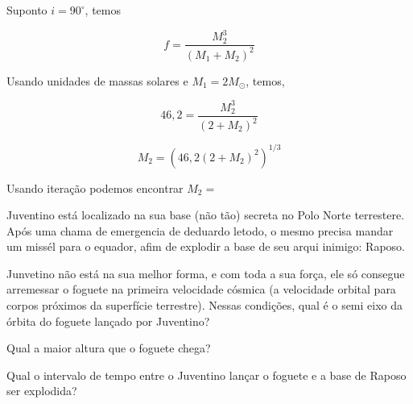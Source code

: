 \documentclass[11pt]{article}
\begin{document}
\begin{pproblem}
\begin{pssolution*}{}{}
\begin{alternativas}
            \item Suponto $i = 90^\circ$, temos 
            
            $$f = \frac{M_2^3}{(M_1+M_2)^2}$$

            Usando unidades de massas solares e $M_1 = 2M_\odot$, temos, 

            $$46,2 = \frac{M_2^3}{(2+M_2)^2}$$

            $$M_2 = \left(46,2 (2+M_2)^2\right)^{1/3}$$

            Usando iteração podemos encontrar $\boxed{M_2 = }$
        \end{alternativas}
    \end{pssolution*}
\end{pproblem}

\begin{pproblem} Juventino está localizado na sua base (não tão) secreta no Polo Norte terrestere. Após uma chama de emergencia de deduardo letodo, o mesmo precisa mandar um missél para o equador, afim de explodir a base de seu arqui inimigo: Raposo. 
    \begin{alternativas}
        \item Junvetino não está na sua melhor forma, e com toda a sua força, ele só consegue arremessar o foguete na primeira velocidade cósmica (a velocidade orbital para corpos próximos da superfície terrestre). Nessas condições, qual é o semi eixo da órbita do foguete lançado por Juventino?
        \item Qual a maior altura que o foguete chega?
        \item Qual o intervalo de tempo entre o Juventino lançar o foguete e a base de Raposo ser explodida?
    \end{alternativas}
    
\end{pproblem}
\end{document}
